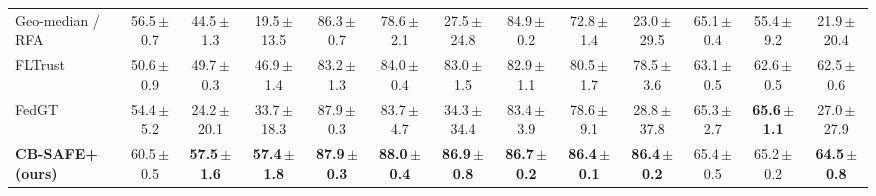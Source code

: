 \begin{table}[!t]
\begin{tabular}{@{}lcccccccccccc@{}}
Geo-median / RFA~\cite{rfa} & 56.5\,{\scriptsize$\pm$0.7} & 44.5\,{\scriptsize$\pm$1.3} & 19.5\,{\scriptsize$\pm$13.5} & 86.3\,{\scriptsize$\pm$0.7} & 78.6\,{\scriptsize$\pm$2.1} & 27.5\,{\scriptsize$\pm$24.8} & 84.9\,{\scriptsize$\pm$0.2} & 72.8\,{\scriptsize$\pm$1.4} & 23.0\,{\scriptsize$\pm$29.5} & 65.1\,{\scriptsize$\pm$0.4} & 55.4\,{\scriptsize$\pm$9.2} & 21.9\,{\scriptsize$\pm$20.4}\\
FLTrust~\cite{fltrust} & 50.6\,{\scriptsize$\pm$0.9} & 49.7\,{\scriptsize$\pm$0.3} & 46.9\,{\scriptsize$\pm$1.4} & 83.2\,{\scriptsize$\pm$1.3} & 84.0\,{\scriptsize$\pm$0.4} & 83.0\,{\scriptsize$\pm$1.5} & 82.9\,{\scriptsize$\pm$1.1} & 80.5\,{\scriptsize$\pm$1.7} & 78.5\,{\scriptsize$\pm$3.6} & 63.1\,{\scriptsize$\pm$0.5} & 62.6\,{\scriptsize$\pm$0.5} & 62.5\,{\scriptsize$\pm$0.6}\\
FedGT~\cite{fedgt} & 54.4\,{\scriptsize$\pm$5.2} & 24.2\,{\scriptsize$\pm$20.1} & 33.7\,{\scriptsize$\pm$18.3} & 87.9\,{\scriptsize$\pm$0.3} & 83.7\,{\scriptsize$\pm$4.7} & 34.3\,{\scriptsize$\pm$34.4} & 83.4\,{\scriptsize$\pm$3.9} & 78.6\,{\scriptsize$\pm$9.1} & 28.8\,{\scriptsize$\pm$37.8} & 65.3\,{\scriptsize$\pm$2.7} & \textbf{65.6\,{\scriptsize$\pm$1.1}} & 27.0\,{\scriptsize$\pm$27.9}\\
\textbf{CB-SAFE+ (ours)} & 60.5\,{\scriptsize$\pm$0.5} & \textbf{57.5\,{\scriptsize$\pm$1.6}} & \textbf{57.4\,{\scriptsize$\pm$1.8}} & \textbf{87.9\,{\scriptsize$\pm$0.3}} & \textbf{88.0\,{\scriptsize$\pm$0.4}} & \textbf{86.9\,{\scriptsize$\pm$0.8}} & \textbf{86.7\,{\scriptsize$\pm$0.2}} & \textbf{86.4\,{\scriptsize$\pm$0.1}} & \textbf{86.4\,{\scriptsize$\pm$0.2}} & 65.4\,{\scriptsize$\pm$0.5} & 65.2\,{\scriptsize$\pm$0.2} & \textbf{64.5\,{\scriptsize$\pm$0.8}}\\
\bottomrule\end{tabular}
\end{table}